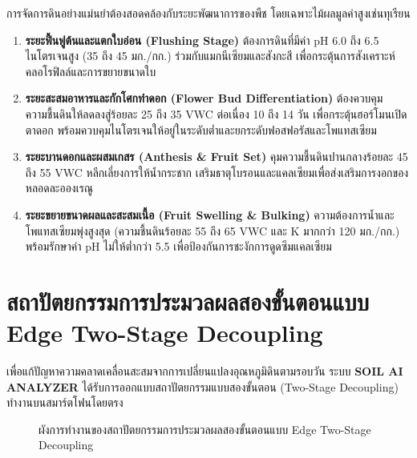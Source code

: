 การจัดการดินอย่างแม่นยำต้องสอดคล้องกับระยะพัฒนาการของพืช โดยเฉพาะไม้ผลมูลค่าสูงเช่นทุเรียน
\begin{enumerate}
    \item \textbf{ระยะฟื้นฟูต้นและแตกใบอ่อน (Flushing Stage)} ต้องการดินที่มีค่า pH 6.0 ถึง 6.5 ไนโตรเจนสูง (35 ถึง 45 มก./กก.) ร่วมกับแมกนีเซียมและสังกะสี เพื่อกระตุ้นการสังเคราะห์คลอโรฟิลล์และการขยายขนาดใบ
    \item \textbf{ระยะสะสมอาหารและกักโศกทำดอก (Flower Bud Differentiation)} ต้องควบคุมความชื้นดินให้ลดลงสู่ร้อยละ 25 ถึง 35 VWC ต่อเนื่อง 10 ถึง 14 วัน เพื่อกระตุ้นฮอร์โมนเปิดตาดอก พร้อมควบคุมไนโตรเจนให้อยู่ในระดับต่ำและยกระดับฟอสฟอรัสและโพแทสเซียม
    \item \textbf{ระยะบานดอกและผสมเกสร (Anthesis \& Fruit Set)} คุมความชื้นดินปานกลางร้อยละ 45 ถึง 55 VWC หลีกเลี่ยงการให้น้ำกระชาก เสริมธาตุโบรอนและแคลเซียมเพื่อส่งเสริมการงอกของหลอดละอองเรณู
    \item \textbf{ระยะขยายขนาดผลและสะสมเนื้อ (Fruit Swelling \& Bulking)} ความต้องการน้ำและโพแทสเซียมพุ่งสูงสุด (ความชื้นดินร้อยละ 55 ถึง 65 VWC และ K มากกว่า 120 มก./กก.) พร้อมรักษาค่า pH ไม่ให้ต่ำกว่า 5.5 เพื่อป้องกันการชะงักการดูดซึมแคลเซียม
\end{enumerate}

\section{สถาปัตยกรรมการประมวลผลสองขั้นตอนแบบ Edge Two-Stage Decoupling}

เพื่อแก้ปัญหาความคลาดเคลื่อนสะสมจากการเปลี่ยนแปลงอุณหภูมิดินตามรอบวัน ระบบ \textbf{SOIL AI ANALYZER} ได้รับการออกแบบสถาปัตยกรรมแบบสองขั้นตอน (Two-Stage Decoupling) ทำงานบนสมาร์ตโฟนโดยตรง

\begin{figure}[H]
\centering
{}
\caption{ผังการทำงานของสถาปัตยกรรมการประมวลผลสองขั้นตอนแบบ Edge Two-Stage Decoupling}
\label{fig:two_stage_arch}
\end{figure}

